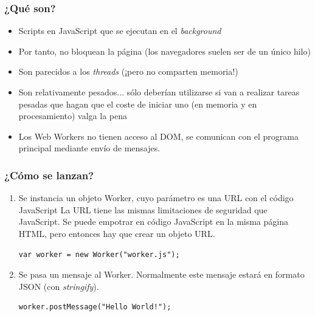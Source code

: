 
\begin{frame}
\frametitle{¿Qué son?}

\begin{itemize}
  \item Scripts en JavaScript que se ejecutan en el \emph{background}
  \item Por tanto, no bloquean la página (los navegadores suelen ser de un único hilo)
  \item Son parecidos a los \emph{threads} (¡pero no comparten memoria!)
  \item Son relativamente pesados... sólo deberían utilizarse si van a realizar
tareas pesadas que hagan que el coste de iniciar uno (en memoria y en procesamiento)
valga la pena
  \item Los Web Workers no tienen acceso al DOM, se comunican con el programa principal mediante
envío de mensajes.
\end{itemize}

\end{frame}



\begin{frame}[fragile]
\frametitle{¿Cómo se lanzan?}

\begin{enumerate}

  \item Se instancia un objeto Worker, cuyo parámetro es una URL con el código JavaScript
  La URL tiene las mismas limitaciones de seguridad que JavaScript.
  Se puede empotrar en código JavaScript en la misma página HTML, pero entonces hay que
crear un objeto URL.

  \begin{verbatim}
var worker = new Worker("worker.js");
  \end{verbatim}

  \item Se pasa un mensaje al Worker.
  Normalmente este mensaje estará en formato JSON (con \emph{stringify}).

  \begin{verbatim}
worker.postMessage("Hello World!");
  \end{verbatim}
\end{enumerate}

\end{frame}


